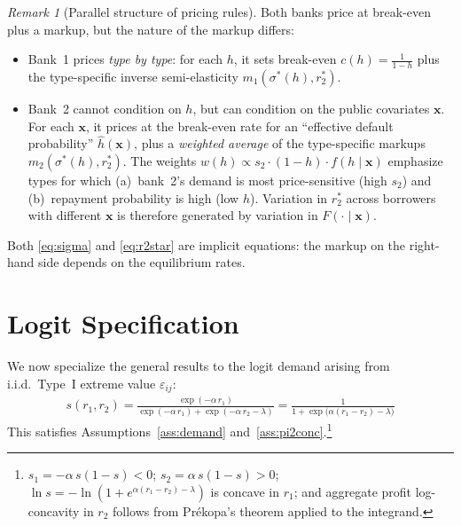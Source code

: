 \documentclass[12pt]{article}
\theoremstyle{plain}
\theoremstyle{plain}
\theoremstyle{definition}  %
\theoremstyle{remark}  %
\newtheorem{remark}[thm]{Remark}  %
\begin{document}
\begin{remark}[Parallel structure of pricing rules]\label{rem:parallel}
Both banks price at break-even plus a markup, but the nature of the markup differs:
\begin{itemize}
    \item Bank~1 prices \emph{type by type}: for each $h$, it sets break-even $c(h) = \frac{1}{1-h}$ plus the type-specific inverse semi-elasticity $m_1(\sigma^*(h), r_2^*)$.
    \item Bank~2 cannot condition on $h$, but can condition on the public covariates $\mathbf{x}$. For each $\mathbf{x}$, it prices at the break-even rate for an ``effective default probability'' $\hat{h}(\mathbf{x})$, plus a \emph{weighted average} of the type-specific markups $m_2(\sigma^*(h), r_2^*)$. The weights $w(h) \propto s_2 \cdot (1-h) \cdot f(h \mid \mathbf{x})$ emphasize types for which (a)~bank~2's demand is most price-sensitive (high $s_2$) and (b)~repayment probability is high (low $h$). Variation in $r_2^*$ across borrowers with different $\mathbf{x}$ is therefore generated by variation in $F(\cdot \mid \mathbf{x})$.
\end{itemize}
Both \eqref{eq:sigma} and \eqref{eq:r2star} are implicit equations: the markup on the right-hand side depends on the equilibrium rates.
\end{remark}




\section{Logit Specification}\label{sec:logit}

We now specialize the general results to the logit demand arising from i.i.d.\ Type~I extreme value $\varepsilon_{ij}$:
\begin{align}\label{eq:logit_share}
    s(r_1, r_2) = \frac{\exp(-\alpha\, r_1)}{\exp(-\alpha\, r_1) + \exp(-\alpha\, r_2 - \lambda)} = \frac{1}{1 + \exp\!\big(\alpha(r_1 - r_2) - \lambda\big)}
\end{align}
This satisfies Assumptions~\ref{ass:demand} and~\ref{ass:pi2conc}.\footnote{$s_1 = -\alpha\,s(1-s) < 0$; $s_2 = \alpha\,s(1-s) > 0$; $\ln s = -\ln(1+e^{\alpha(r_1-r_2)-\lambda})$ is concave in $r_1$; and aggregate profit log-concavity in $r_2$ follows from Pr\'ekopa's theorem applied to the integrand.}
\end{document}
